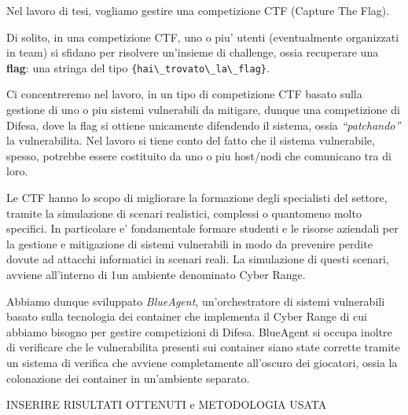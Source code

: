 Nel lavoro di tesi, vogliamo gestire una competizione CTF (Capture The
Flag).

Di solito, in una competizione CTF, uno o piu' utenti (eventualmente
organizzati in team) si sfidano per risolvere un'insieme di challenge,
ossia recuperare una \textbf{flag}: una stringa del tipo
\passthrough{\lstinline!\{hai\_trovato\_la\_flag\}!}.

Ci concentreremo nel lavoro, in un tipo di competizione CTF basato sulla
gestione di uno o piu sistemi vulnerabili da mitigare, dunque una
competizione di Difesa, dove la flag si ottiene unicamente difendendo il
sistema, ossia \emph{``patchando''} la vulnerabilita. Nel lavoro si
tiene conto del fatto che il sistema vulnerabile, spesso, potrebbe
essere costituito da uno o piu host/nodi che comunicano tra di loro.

Le CTF hanno lo scopo di migliorare la formazione degli specialisti del
settore, tramite la simulazione di scenari realistici, complessi o
quantomeno molto specifici. In particolare e' fondamentale formare
studenti e le risorse aziendali per la gestione e mitigazione di sistemi
vulnerabili in modo da prevenire perdite dovute ad attacchi informatici
in scenari reali. La simulazione di questi scenari, avviene all'interno
di 1un ambiente denominato Cyber Range.

Abbiamo dunque sviluppato \emph{BlueAgent}, un'orchestratore di sistemi
vulnerabili basato sulla tecnologia dei container che implementa il
Cyber Range di cui abbiamo bisogno per gestire competizioni di Difesa.
BlueAgent si occupa inoltre di verificare che le vulnerabilita presenti
sui container siano state corrette tramite un sistema di verifica che
avviene completamente all'oscuro dei giocatori, ossia la colonazione dei
container in un'ambiente separato.

INSERIRE RISULTATI OTTENUTI e METODOLOGIA USATA
